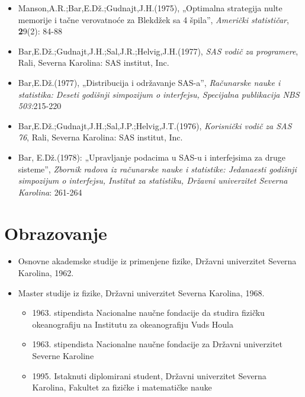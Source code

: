 \documentclass[a4paper]{article}
\begin{document}
{		\begin{itemize}
			\item Manson,A.R.;Bar,E.Dž.;Gudnajt,J.H.(1975), „Optimalna strategija nulte memorije i tačne verovatnoće za Blekdžek sa 4 špila”, \textit{Američki statističar}, \textbf29(2): 84-88
			\item Bar,E.Dž.;Gudnajt,J.H.;Sal,J.R.;Helvig,J.H.(1977), \textit{SAS vodič za programere}, Rali, Severna Karolina: SAS institut, Inc.
			\item Bar,E.Dž.(1977), „Distribucija i održavanje SAS-a”, \textit{Računarske nauke i statistika: Deseti godišnji simpozijum o interfejsu, Specijalna publikacija NBS 503:}215-220
			\item Bar,E.Dž.;Gudnajt,J.H.;Sal,J.P.;Helvig,J.T.(1976), \textit{Korisnički vodič za SAS 76}, Rali, Severna Karolina: SAS institut, Inc.
			\item Bar, E.Dž.(1978): „Upravljanje podacima u SAS-u i interfejsima za druge sisteme”, \textit{Zbornik radova iz računarske nauke i statistike: Jedanaesti godišnji simpozijum o interfejsu, Institut za statistiku, Državni univerzitet Severna Karolina}: 261-264
		\end{itemize}
		
		
		\newpage
		
		\section{Obrazovanje}
		
		\begin{itemize}
			\item Osnovne akademske studije iz primenjene fizike, Državni univerzitet Severna Karolina, 1962.
			\item Master studije iz fizike, Državni univerzitet Severna Karolina, 1968.
			\begin{itemize}
				\item 1963. stipendista Nacionalne naučne fondacije da studira fizičku okeanografiju na Institutu za okeanografiju Vuds Houla
				\item 1963. stipendista Nacionalne naučne fondacije za Državni univerzitet Severne Karoline
				\item 1995. Istaknuti diplomirani student, Državni univerzitet Severna Karolina, Fakultet za fizičke i matematičke nauke
			\end{itemize}
		\end{itemize}
		
		}
\end{document}
